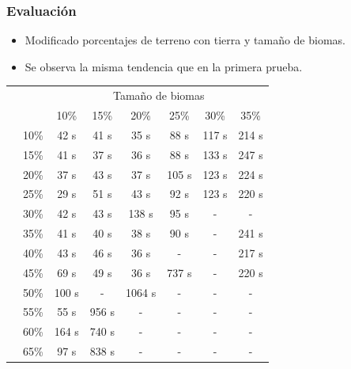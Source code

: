 \begin{frame}
\frametitle{Evaluación}

\begin{itemize}
	\item<1-> Modificado porcentajes de terreno con tierra y tamaño de biomas.
	
	\vspace{0.5em}
	
	\item<2-> Se observa la  misma tendencia que en la primera prueba.
\end{itemize}

\pause[2]

\begin{table}[!h]
	\centering
	\begin{tabular}{cc|cccccc}
		& & \multicolumn{6}{c}{Tamaño de biomas} \\
		& & 10\% & 15\% & 20\% & 25\% & 30\% & 35\% \\
		\hline
		\parbox[t]{2mm}{} & 10\% & 42 s & 41 s & 35 s & 88 s & 117 s & 214 s \\
		& 15\% & 41 s & 37 s & 36 s & 88 s & 133 s & 247 s \\
		& 20\% & 37 s & 43 s & 37 s & 105 s & 123 s & 224 s \\
		& 25\% & 29 s & 51 s & 43 s & 92 s & 123 s & 220 s \\
		& 30\% & 42 s & 43 s & 138 s & 95 s & - & - \\
		& 35\% & 41 s & 40 s & 38 s & 90 s & - & 241 s \\
		& 40\% & 43 s & 46 s & 36 s & -  & - & 217 s  \\
		& 45\% & 69 s & 49 s & 36 s & 737 s & - & 220 s \\
		& 50\% & 100 s & - & 1064 s & - & - & - \\
		& 55\% & 55 s & 956 s & - & - & - & - \\
		& 60\% & 164 s & 740 s & - & - & - & - \\
		& 65\% & 97 s & 838 s & - & - & - & - \\
		\hline
	\end{tabular}
\end{table}

\end{frame}